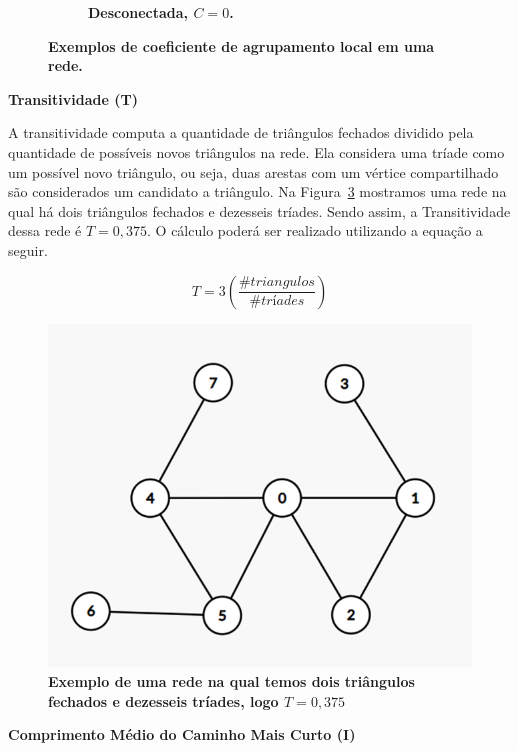 \documentclass[
12pt,        %
oneside,     %
a4paper,     %
english,       %
brazil        %
%
%
]{ppgca}
\begin{document}
\begin{figure}[H]
\begin{subfigure}[b]{0.4\textwidth}
        \centering
        \caption{\textbf{Desconectada, $C = 0$.}}
        \label{fig:localcluster4}
    \end{subfigure}
    \caption{\textbf{Exemplos de coeficiente de agrupamento local em uma rede.}}
    \label{fig:localcluster}
\end{figure}

\textbf{Transitividade (T)}

A transitividade computa a quantidade de triângulos fechados dividido pela quantidade de possíveis novos triângulos na rede. Ela considera uma tríade como um possível novo triângulo, ou seja, duas arestas com um vértice compartilhado são considerados um candidato a triângulo. Na Figura~\ref{fig:transitividade} mostramos uma rede na qual há dois triângulos fechados e dezesseis tríades. Sendo assim, a Transitividade dessa rede é $T = 0,375$. O cálculo poderá ser realizado utilizando a equação a seguir.

\begin{equation}
    {T}=3(\frac{\#triangulos}{\#tríades} )
\end{equation}

\begin{figure}[H]
    \includegraphics{transitividade.png}
    \centering
    \caption{\textbf{Exemplo de uma rede na qual temos dois triângulos fechados e dezesseis tríades, logo $T = 0,375$}}
    \label{fig:transitividade}
\end{figure}


\textbf{Comprimento Médio do Caminho Mais Curto (I)}
\end{document}
